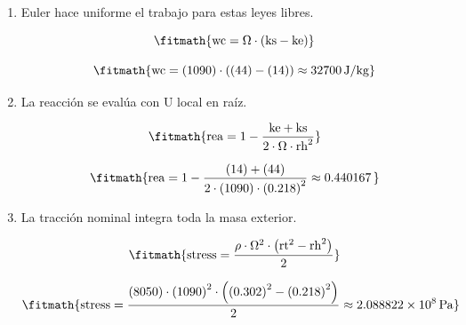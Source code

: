 \begin{enumerate}

\item Euler hace uniforme el trabajo para estas leyes libres.

\[\fitmath{\mathrm{wc}=\Omega\cdot \left(\mathrm{ks}-\mathrm{ke}\right)}\]

\[\fitmath{\mathrm{wc}=(1090)\cdot \left((44)-(14)\right)\approx 32700\,\mathrm{J/kg}}\]

\item La reacción se evalúa con U local en raíz.

\[\fitmath{\mathrm{rea}=1-\frac{\mathrm{ke}+\mathrm{ks}}{2\cdot \Omega\cdot {\mathrm{rh}}^{2}}}\]

\[\fitmath{\mathrm{rea}=1-\frac{(14)+(44)}{2\cdot (1090)\cdot {(0.218)}^{2}}\approx 0.440167\,}\]

\item La tracción nominal integra toda la masa exterior.

\[\fitmath{\mathrm{stress}=\frac{\rho\cdot {\Omega}^{2}\cdot \left({\mathrm{rt}}^{2}-{\mathrm{rh}}^{2}\right)}{2}}\]

\[\fitmath{\mathrm{stress}=\frac{(8050)\cdot {(1090)}^{2}\cdot \left({(0.302)}^{2}-{(0.218)}^{2}\right)}{2}\approx 2.088822\times10^{8}\,\mathrm{Pa}}\]

\end{enumerate}
